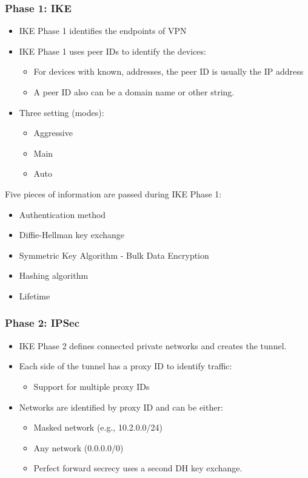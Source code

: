 \subsubsection{Phase 1: IKE}
\begin{itemize}
    \item IKE Phase 1 identifies the endpoints of VPN
    \item IKE Phase 1 uses peer IDs to identify the devices:
        \begin{itemize}
            \item For devices with known, addresses, the peer ID is usually the IP address
            \item A peer ID also can be a domain name or other string.
        \end{itemize}
    \item Three setting (modes):
        \begin{itemize}
            \item Aggressive
            \item Main
            \item Auto
        \end{itemize}
\end{itemize}

Five pieces of information are passed during IKE Phase 1:
\begin{itemize}
    \item Authentication method
    \item Diffie-Hellman key exchange
    \item Symmetric Key Algorithm - Bulk Data Encryption
    \item Hashing algorithm
    \item Lifetime
\end{itemize}

\subsubsection{Phase 2: IPSec}
\begin{itemize}
    \item IKE Phase 2 defines connected private networks and creates the tunnel.
    \item Each side of the tunnel has a proxy ID to identify traffic:
        \begin{itemize}
            \item Support for multiple proxy IDs
        \end{itemize}
    \item Networks are identified by proxy ID and can be either:
        \begin{itemize}
            \item Masked network (e.g., 10.2.0.0/24)
            \item Any network (0.0.0.0/0)
            \item Perfect forward secrecy uses a second DH key exchange.
        \end{itemize}
\end{itemize}

